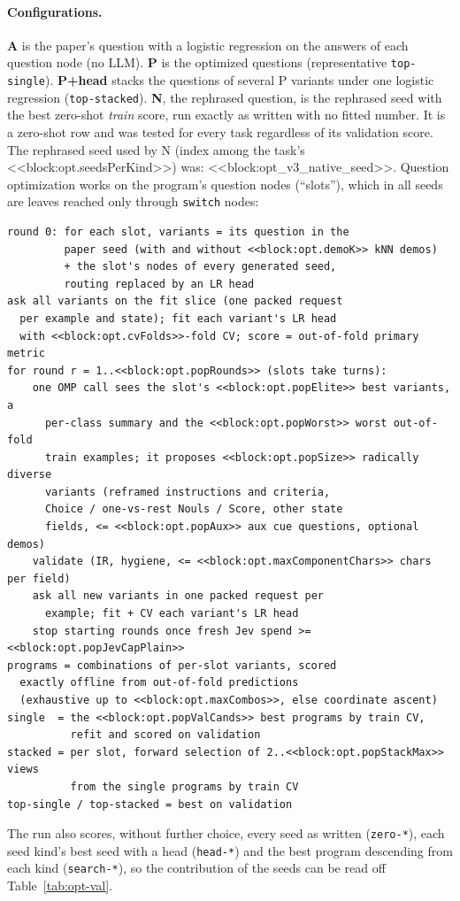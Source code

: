 \paragraph{Configurations.}
\textbf{A} is the paper's question with a logistic regression on the answers of each question node (no LLM). \textbf{P} is the optimized questions (representative \texttt{top-single}). \textbf{P+head} stacks the questions of several P variants under one logistic regression (\texttt{top-stacked}). \textbf{N}, the rephrased question, is the rephrased seed with the best zero-shot \emph{train} score, run exactly as written with no fitted number. It is a zero-shot row and was tested for every task regardless of its validation score. The rephrased seed used by N (index among the task's <<block:opt.seedsPerKind>>) was: <<block:opt_v3_native_seed>>. Question optimization works on the program's question nodes (``slots''), which in all seeds are leaves reached only through \texttt{switch} nodes:
\par{\scriptsize
\begin{verbatim}
round 0: for each slot, variants = its question in the
         paper seed (with and without <<block:opt.demoK>> kNN demos)
         + the slot's nodes of every generated seed,
         routing replaced by an LR head
ask all variants on the fit slice (one packed request
  per example and state); fit each variant's LR head
  with <<block:opt.cvFolds>>-fold CV; score = out-of-fold primary metric
for round r = 1..<<block:opt.popRounds>> (slots take turns):
    one OMP call sees the slot's <<block:opt.popElite>> best variants, a
      per-class summary and the <<block:opt.popWorst>> worst out-of-fold
      train examples; it proposes <<block:opt.popSize>> radically diverse
      variants (reframed instructions and criteria,
      Choice / one-vs-rest Nouls / Score, other state
      fields, <= <<block:opt.popAux>> aux cue questions, optional demos)
    validate (IR, hygiene, <= <<block:opt.maxComponentChars>> chars per field)
    ask all new variants in one packed request per
      example; fit + CV each variant's LR head
    stop starting rounds once fresh Jev spend >= <<block:opt.popJevCapPlain>>
programs = combinations of per-slot variants, scored
  exactly offline from out-of-fold predictions
  (exhaustive up to <<block:opt.maxCombos>>, else coordinate ascent)
single  = the <<block:opt.popValCands>> best programs by train CV,
          refit and scored on validation
stacked = per slot, forward selection of 2..<<block:opt.popStackMax>> views
          from the single programs by train CV
top-single / top-stacked = best on validation
\end{verbatim}
}
\noindent The run also scores, without further choice, every seed as written (\texttt{zero-*}), each seed kind's best seed with a head (\texttt{head-*}) and the best program descending from each kind (\texttt{search-*}), so the contribution of the seeds can be read off Table~\ref{tab:opt-val}.

